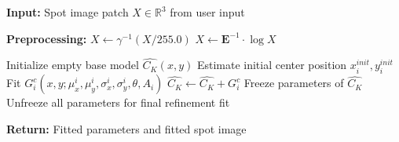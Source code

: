 \begin{spacing}{1.5}
\begin{algorithm}
\begin{algorithmic}[1]
    \State \textbf{Input:} Spot image patch $X\in\mathbb{R}^3$ from user input
    
    \State \textbf{Preprocessing:}
        \State $X \gets \gamma^{-1}(X/255.0)$ 
        \State $X \gets \mathbf{E}^{-1}\cdot\log{X}$ 
    
        \State Initialize empty base model $\hat{C_K}(x, y)$
            \State Estimate initial center position $x^{init}_i, y^{init}_i$
            \State Fit $G_i^c(x, y; \mu_x^i, \mu_y^i, \sigma_x^i, \sigma_y^i, \theta, A_i)$
            \State $\hat{C_K} \gets \hat{C_K}+G_i^c$
            \State Freeze parameters of $\hat{C_K}$
        \EndFor
        \State Unfreeze all parameters for final refinement fit
    \EndFor
    
    \State \textbf{Return:} Fitted parameters and fitted spot image
    
    \end{algorithmic}
    \end{algorithm}

\end{spacing}
\newpage
